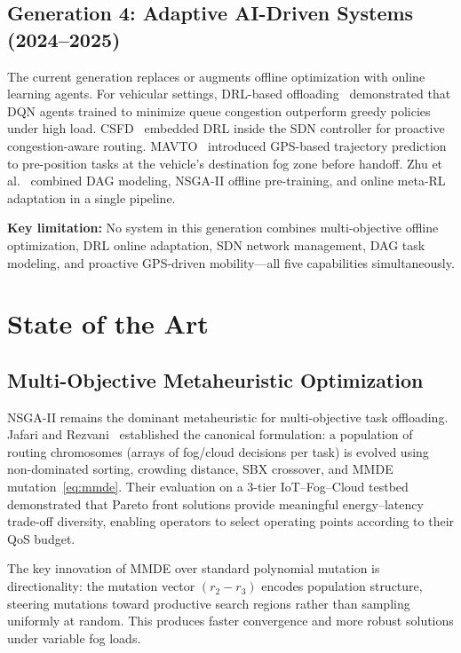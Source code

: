 \documentclass[12pt,a4paper]{article}
\begin{document}
\subsection{Generation 4: Adaptive AI-Driven Systems (2024--2025)}

The current generation replaces or augments offline optimization with online
learning agents. For vehicular settings, DRL-based offloading~\cite{vfc_drl2024}
demonstrated that DQN agents trained to minimize queue congestion outperform
greedy policies under high load. CSFD~\cite{csfd2025} embedded DRL inside the
SDN controller for proactive congestion-aware routing. MAVTO~\cite{mavto2024}
introduced GPS-based trajectory prediction to pre-position tasks at the
vehicle's destination fog zone before handoff. Zhu et al.~\cite{zhu2025dag}
combined DAG modeling, NSGA-II offline pre-training, and online meta-RL adaptation
in a single pipeline.

\textbf{Key limitation:} No system in this generation combines multi-objective
offline optimization, DRL online adaptation, SDN network management, DAG task
modeling, and proactive GPS-driven mobility---all five capabilities simultaneously.

\section{State of the Art}
\label{sec:sota}

\subsection{Multi-Objective Metaheuristic Optimization}

NSGA-II remains the dominant metaheuristic for multi-objective task offloading.
Jafari and Rezvani~\cite{jafari2021} established the canonical formulation: a
population of routing chromosomes (arrays of fog/cloud decisions per task) is
evolved using non-dominated sorting, crowding distance, SBX crossover, and MMDE
mutation~\eqref{eq:mmde}. Their evaluation on a 3-tier IoT--Fog--Cloud testbed
demonstrated that Pareto front solutions provide meaningful energy--latency
trade-off diversity, enabling operators to select operating points according to
their QoS budget.

The key innovation of MMDE over standard polynomial mutation is directionality:
the mutation vector $(r_2 - r_3)$ encodes population structure, steering mutations
toward productive search regions rather than sampling uniformly at random. This
produces faster convergence and more robust solutions under variable fog loads.
\end{document}
